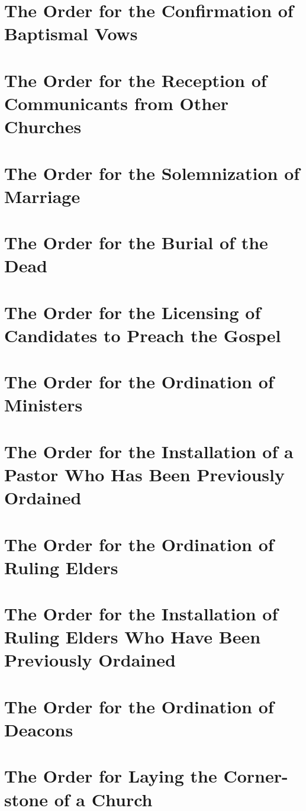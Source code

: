 \documentclass[titlepage,a5paper,12pt]{book}
\begin{document}
\chapter[Order for Confirmation]{The Order for the Confirmation of Baptismal Vows}
\chapter[Reception of Communicants]{The Order for the Reception of Communicants from Other Churches}
\chapter[Solemnization of Marriage]{The Order for the Solemnization of Marriage}

\chapter[Burial of the Dead]{The Order for the Burial of the Dead}

\chapter[Licensing of Candidates]{The Order for the Licensing of Candidates to Preach the Gospel}
\chapter[Ordination of Ministers]{The Order for the Ordination of Ministers}
\chapter[Installation of a Pastor]{The Order for the Installation of a Pastor Who Has Been Previously Ordained}
\chapter[Ordination of Ruling Elders]{The Order for the Ordination of Ruling Elders}
\chapter[Installation of Ruling Elders]{The Order for the Installation of Ruling Elders Who Have Been Previously Ordained}
\chapter[Ordination of Deacons]{The Order for the Ordination of Deacons}
\chapter[Laying the Corner-stone]{The Order for Laying the Corner-stone of a Church}
\end{document}
